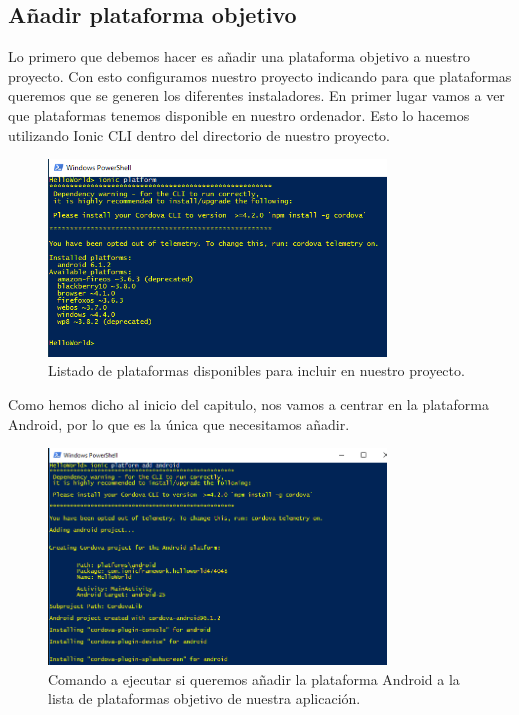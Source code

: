 \subsection{Añadir plataforma objetivo}

Lo primero que debemos hacer es añadir una plataforma objetivo a nuestro proyecto. Con esto configuramos nuestro proyecto indicando para que plataformas queremos que se generen los diferentes instaladores. En primer lugar vamos a ver que plataformas tenemos disponible en nuestro ordenador. Esto lo hacemos utilizando Ionic CLI dentro del directorio de nuestro proyecto.

\begin{figure}[H]
\centering
    \centering
        \includegraphics[width=0.8\textwidth]{Figures/ch2/BuildAndEmulate/available_platforms}
    \caption{Listado de plataformas disponibles para incluir en nuestro proyecto.}
\end{figure}

Como hemos dicho al inicio del capitulo, nos vamos a centrar en la plataforma Android, por lo que es la única que necesitamos añadir.

\begin{figure}[H]
\centering
    \centering
        \includegraphics[width=0.8\textwidth]{Figures/ch2/BuildAndEmulate/add_android}
    \caption{Comando a ejecutar si queremos añadir la plataforma Android a la lista de plataformas objetivo de nuestra aplicación.}
\end{figure}

